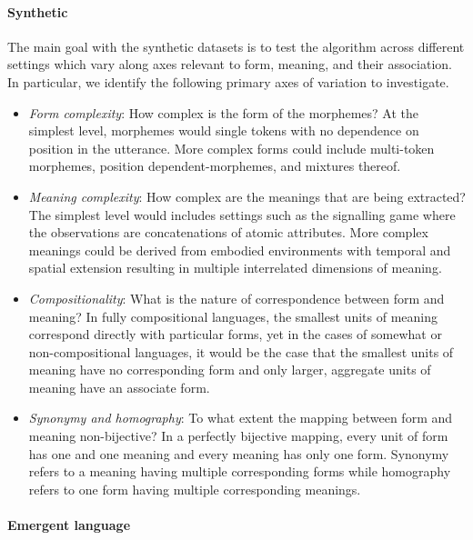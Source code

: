 \paragraph{Synthetic}

The main goal with the synthetic datasets is to test the algorithm across different settings which vary along axes relevant to form, meaning, and their association.
In particular, we identify the following primary axes of variation to investigate.
\begin{itemize}
  \item \emph{Form complexity}:
    How complex is the form of the morphemes?
    At the simplest level, morphemes would single tokens with no dependence on position in the utterance.
    More complex forms could include multi-token morphemes, position dependent-morphemes, and mixtures thereof.
  \item \emph{Meaning complexity}:
    How complex are the meanings that are being extracted?
    The simplest level would includes settings such as the signalling game where the observations are concatenations of atomic attributes.
    More complex meanings could be derived from embodied environments with temporal and spatial extension resulting in multiple interrelated dimensions of meaning.
  \item \emph{Compositionality}:
    What is the nature of correspondence between form and meaning?
    In fully compositional languages, the smallest units of meaning correspond directly with particular forms, yet in the cases of somewhat or non-compositional languages, it would be the case that the smallest units of meaning have no corresponding form and only larger, aggregate units of meaning have an associate form.
  \item \emph{Synonymy and homography}:
    To what extent the mapping between form and meaning non-bijective?
    In a perfectly bijective mapping, every unit of form has one and one meaning and every meaning has only one form.
    Synonymy refers to a meaning having multiple corresponding forms while homography refers to one form having multiple corresponding meanings.
\end{itemize}

\paragraph{Emergent language}

